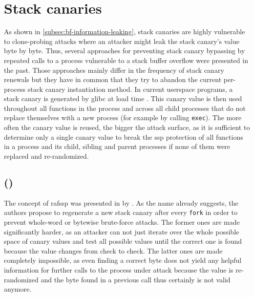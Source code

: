 \section{Stack canaries}
\label{sec:stack-canary-improvements}

As shown in \cref{subsec:bf-information-leaking}, stack canaries are highly vulnerable to clone-probing attacks where an attacker might leak the stack canary's value byte by byte.
Thus, several approaches for preventing stack canary bypassing by repeated calls to a process vulnerable to a stack buffer overflow were presented in the past.
Those approaches mainly differ in the frequency of stack canary renewals but they have in common that they try to abandon the current per-process stack canary instantiation method.
In current userspace programs, a stack canary is generated by \gls{glibc} at load time \cite[\texttt{csu/libc-start.c}]{FSF2020a}.
This canary value is then used throughout all functions in the process and across all child processes that do not replace themselves with a new process (for example by calling \texttt{exec}).
The more often the canary value is reused, the bigger the attack surface, as it is sufficient to determine only a single canary value to break the \gls{ssp} protection of all functions in a process and its child, sibling and parent processes if none of them were replaced and re-randomized.

\subsection{ ()}
\label{subsec:renewssp}

The concept of \gls{rafssp} was presented in \citeyear{MarcoGisbert2013} by \citeauthor{MarcoGisbert2013}.
As the name already suggests, the authors propose to regenerate a new stack canary after every \texttt{fork} in order to prevent whole-word or bytewise brute-force attacks.
The former ones are made significantly harder, as an attacker can not just iterate over the whole possible space of canary values and test all possible values until the correct one is found because the value changes from check to check.
The latter ones are made completely impossible, as even finding a correct byte does not yield any helpful information for further calls to the process under attack because the value is re-randomized and the byte found in a previous call thus certainly is not valid anymore.

